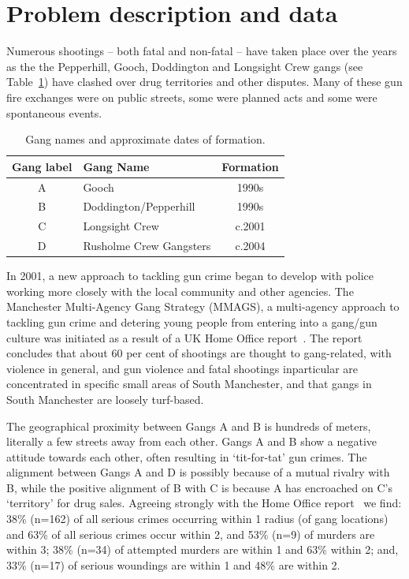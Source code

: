 \documentclass[conference]{IEEEtran}
\theoremstyle{definition}
\begin{document}
\section{Problem description and data}\label{sec:problemdescription}


Numerous shootings -- both fatal and non-fatal -- have taken place
over the years as the the Pepperhill, Gooch, Doddington and Longsight
Crew gangs (see Table~\ref{table:gangnames}) have clashed over drug
territories and other disputes. Many of these gun fire exchanges were
on public streets, some were planned acts and some were spontaneous
events.

\begin{table}[htb]
\centering
\begin{tabularx}{\columnwidth}{c X c}
\hline
Gang label & Gang Name & Formation  \\ %
\hline
A & Gooch & 1990s\\
B & Doddington/Pepperhill & 1990s\\
C & Longsight Crew &  c.2001\\
D & Rusholme Crew Gangsters & c.2004\\ %
\hline
\end{tabularx}
\caption{Gang names and approximate dates of formation.}
\label{table:gangnames}
\end{table}

In 2001, a new approach to tackling gun crime began to develop with
police working more closely with the local community and other
agencies. The Manchester Multi-Agency Gang Strategy (MMAGS), a
multi-agency approach to tackling gun crime and detering young people
from entering into a gang/gun culture was initiated as a result of a
UK Home Office report~\cite{BullockTilley2002}. The report concludes
that about 60 per cent of shootings are thought to gang-related, with
violence in general, and gun violence and fatal shootings inparticular
are concentrated in specific small areas of South Manchester, and that
gangs in South Manchester are loosely turf-based.

The geographical proximity between Gangs A and B is hundreds of meters, literally a few streets
away from each other.  Gangs A and B show a negative attitude towards
each other, often resulting in `tit-for-tat' gun crimes. The alignment
between Gangs A and D is possibly because of a mutual rivalry with B,
while the positive alignment of B with C is because A has encroached
on C's `territory' for drug sales. Agreeing strongly with the Home Office
report~\cite{BullockTilley2002} we find: 38\% (n=162) of all serious
crimes occurring within \unit{1}{\kilo\meter} radius (of gang
locations) and 63\% of all serious crimes occur within
\unit{2}{\kilo\meter}, and 53\% (n=9) of murders are within
\unit{3}{\kilo\meter}; 38\% (n=34) of attempted murders are within
\unit{1}{\kilo\meter} and 63\% within \unit{2}{\kilo\meter}; and, 33\%
(n=17) of serious woundings are within \unit{1}{\kilo\meter} and 48\%
are within \unit{2}{\kilo\meter}.
\end{document}
